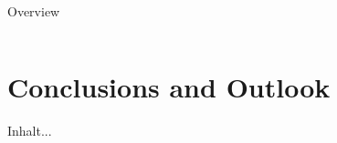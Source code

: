 \documentclass[10pt,aspectratio=169,usenames,dvipsnames]{beamer}
\begin{document}
\begin{frame}{Overview}
\begin{columns}
\begin{column}{0.5\textwidth}
        \end{column}
    \end{columns}
\end{frame}

\section{Conclusions and Outlook}

\begin{frame}
    Inhalt...
\end{frame}
\end{document}

